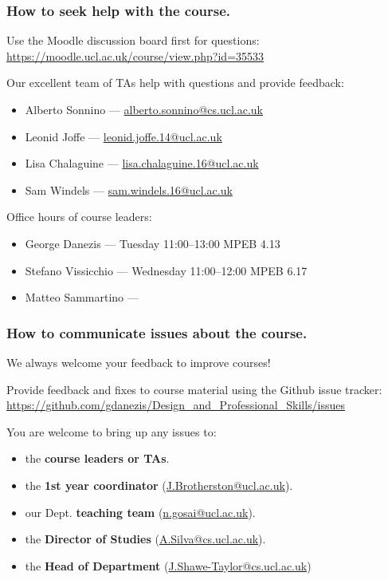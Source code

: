 \documentclass{beamer} %
\newcommand\emc[1]{\textcolor{brightblue}{\textbf{#1}}}
\begin{document}
\begin{frame}
\frametitle{How to seek help with the course.} 

Use the Moodle discussion board first for questions: 
\url{https://moodle.ucl.ac.uk/course/view.php?id=35533}

\vspace{3mm}
Our excellent team of TAs help with questions and provide feedback:
\begin{itemize}
\item Alberto Sonnino --- \url{alberto.sonnino@cs.ucl.ac.uk}
\item Leonid Joffe --- \url{leonid.joffe.14@ucl.ac.uk}
\item Lisa Chalaguine --- \url{lisa.chalaguine.16@ucl.ac.uk}
\item Sam Windels --- \url{sam.windels.16@ucl.ac.uk}
\end{itemize}

\vspace{3mm}
Office hours of course leaders:
\begin{itemize}
\item George Danezis --- Tuesday 11:00--13:00 MPEB 4.13
\item Stefano Vissicchio --- Wednesday 11:00--12:00 MPEB 6.17
\item Matteo Sammartino --- 
\end{itemize}

\end{frame}

\begin{frame}
\frametitle{How to communicate issues about the course.}

We always welcome your feedback to improve courses!

\vspace{3mm}
Provide feedback and fixes to course material using the Github issue tracker:
\url{https://github.com/gdanezis/Design_and_Professional_Skills/issues}

\vspace{3mm}
You are welcome to bring up any issues to:
\begin{itemize}
	\item the \emc{course leaders or TAs}.
	\item the \emc{1st year coordinator} (\url{J.Brotherston@ucl.ac.uk}).
	\item our Dept. \emc{teaching team} (\url{n.gosai@ucl.ac.uk}).
	\item the \emc{Director of Studies} (\url{A.Silva@cs.ucl.ac.uk}).
	\item the \emc{Head of Department} (\url{J.Shawe-Taylor@cs.ucl.ac.uk})
\end{itemize}

\end{frame}



\end{document}
